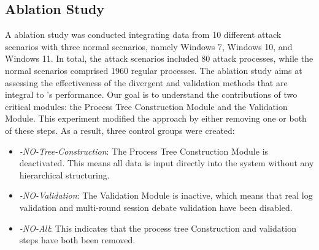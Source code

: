 \subsection{Ablation Study}
\label{sec-ab-study}
A ablation study was conducted integrating data from 10 different attack scenarios with three normal scenarios, namely Windows 7, Windows 10, and Windows 11. In total, the attack scenarios included 80 attack processes, while the normal scenarios comprised 1960 regular processes.
The ablation study aims at assessing the effectiveness of the divergent and validation methods that are integral to \tool's performance. Our goal is to understand the contributions of two critical modules: the Process Tree Construction Module and the Validation Module. 
This experiment modified the approach by either removing one or both of these steps. As a result, three control groups were created:
\begin{itemize}
\item \textit{\tool-NO-Tree-Construction}: The Process Tree Construction Module is deactivated. This means all data is input directly into the system without any hierarchical structuring.
\item \textit{\tool-NO-Validation}: The Validation Module is inactive, which means that real log  validation and multi-round session debate validation have been disabled.
\item \textit{\tool-NO-All}: This indicates that the process tree Construction and validation steps have both been removed.
\end{itemize}

